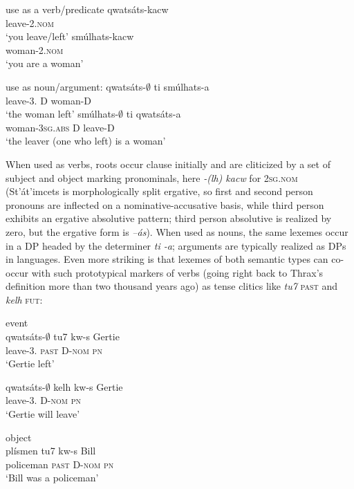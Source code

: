 \documentclass[output=paper]{langsci/langscibook}
\begin{document}
\ea %
 use as a verb/predicate
\ea
\gll qwatsáts-kacw\\
 leave-2{\sg}.\textsc{nom}\\
\glt ‘you leave/left’
\ex 
\gll smúlhats-kacw\\ 
 woman-2{\sg}.\textsc{nom}\\
\glt ‘you are a woman’
\z
\z

\ea%
use as noun/argument:
\ea
\gll qwatsáts-${\emptyset}$ ti smúlhats-a \\
 leave-3{\sg}.{\abs} D woman-D\\
\glt ‘the woman left’
\ex
\gll smúlhats-${\emptyset}$ ti qwatsáts-a \\
 woman-\textsc{3sg.abs} D leave-D\\
\glt ‘the leaver (one who left) is a woman’
\z
\z

  When used as verbs, roots occur clause initially and are cliticized by a set of subject and object marking pronominals, here \textit{-(lh) kacw} for \textsc{2sg.nom}  (St’át’im\-cets is morphologically split ergative, so first and second person pronouns are inflected on a nominative-accusative basis, while third person exhibits an ergative absolutive pattern; third person absolutive is realized by zero, but the ergative form is \textit{–ás}). When used as nouns, the same lexemes occur in a DP headed by the determiner \textit{ti -a}; arguments are typically realized as DPs in  languages. Even more striking is that lexemes of both semantic types can co-occur with such prototypical markers of verbs (going right back to Thrax’s definition more than two thousand years ago) as tense clitics like \textit{tu7} \textsc{past} and \textit{kelh} \textsc{fut}:

\ea
event\\
\ea
 \gll qwatsáts-${\emptyset}$ tu7 kw-s Gertie\\
 leave-3{\sg.\abs} \textsc{past} D-\textsc{nom} \textsc{pn}\\
 \glt ‘Gertie left’

 \ex 
 \gll qwatsáts-${\emptyset}$ kelh kw-s Gertie\\
 leave-3{\sg.\abs} {\fut} D-\textsc{nom} \textsc{pn}\\
 \glt ‘Gertie will leave’
 \z
\z

\ea
 object\\
  \ea
 \gll plísmen tu7 kw-s Bill\\
 policeman \textsc{past} D-\textsc{nom} \textsc{pn}\\
 \glt ‘Bill was a policeman’
 
\end{document}
